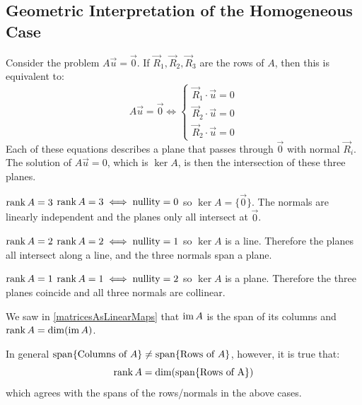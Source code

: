 \documentclass[../main.tex]{subfiles}
\begin{document}
\subsection{Geometric Interpretation of the Homogeneous Case}
Consider the problem $A \vec{u} = \vec{0}$.
If $\vec{R}_1, \vec{R}_2, \vec{R}_3$ are the rows of $A$, then this is equivalent to:
\[
  A \vec{u} = \vec{0} \iff \begin{cases}
  \vec{R}_1 \cdot \vec{u} = 0 \\
  \vec{R}_2 \cdot \vec{u} = 0 \\
  \vec{R}_2 \cdot \vec{u} = 0
  \end{cases}
\]
Each of these equations describes a plane that passes through $\vec{0}$ with normal $\vec{R}_i$.
The solution of $A \vec{u} = 0$, which is $\ker A$, is then the intersection of these three planes.
\begin{proofcases}
  \begin{case}{$\operatorname{rank} A  = 3$}
    $\operatorname{rank} A = 3 \iff \operatorname{nullity} = 0$ so $\ker A = \{\vec{0}\}$.
    The normals are linearly independent and the planes only all intersect at $\vec{0}$.
  \end{case}
  \begin{case}{$\operatorname{rank} A = 2$}
    $\operatorname{rank} A = 2 \iff \operatorname{nullity} = 1$ so $\ker A$ is a line.
    Therefore the planes all intersect along a line, and the three normals span a plane.
  \end{case}
  \begin{case}{$\operatorname{rank} A  = 1$}
    $\operatorname{rank} A = 1 \iff \operatorname{nullity} = 2$ so $\ker A$ is a plane.
    Therefore the three planes coincide and all three normals are collinear.
  \end{case}
\end{proofcases}
\begin{remark}
  We saw in \cref{matricesAsLinearMaps} that $\operatorname{im} A$ is the span of its columns and $\operatorname{rank} A = \dim(\operatorname{im} A)$.

  In general $\operatorname{span}\{\text{Columns of $A$}\} \neq \operatorname{span}\{\text{Rows of $A$}\}$, however, it is true that:
  \[
    \operatorname{rank} A = \dim(\operatorname{span}\{\text{Rows of A}\})
  \]
  which agrees with the spans of the rows/normals in the above cases.
\end{remark}
\end{document}
